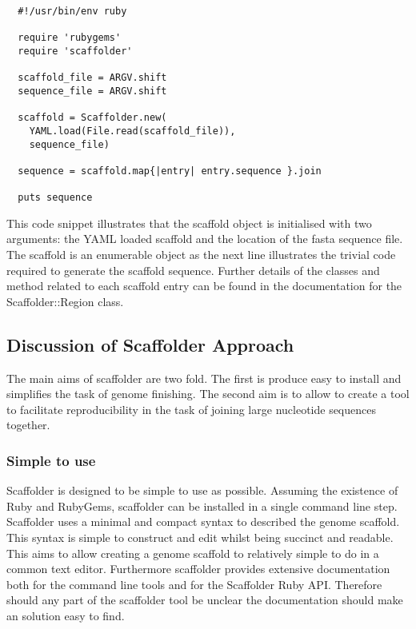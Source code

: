 \documentclass[10pt]{bmc_article}
\newenvironment{bmcformat}{\begin{raggedright}\baselineskip20pt\sloppy\setboolean{publ}{false}}{\end{raggedright}\baselineskip20pt\sloppy}
\begin{document}
\begin{bmcformat}
\begin{verbatim}
  #!/usr/bin/env ruby

  require 'rubygems'
  require 'scaffolder'

  scaffold_file = ARGV.shift
  sequence_file = ARGV.shift

  scaffold = Scaffolder.new(
    YAML.load(File.read(scaffold_file)),
    sequence_file)

  sequence = scaffold.map{|entry| entry.sequence }.join

  puts sequence
\end{verbatim}

This code snippet illustrates that the scaffold object is initialised with two
arguments: the YAML loaded scaffold and the location of the fasta sequence
file. The scaffold is an enumerable object as the next line illustrates the
trivial code required to generate the scaffold sequence. Further details of
the classes and method related to each scaffold entry can be found in the
documentation for the Scaffolder::Region class. \pb

\subsection*{Discussion of Scaffolder Approach} %

The main aims of scaffolder are two fold. The first is produce easy to
install and simplifies the task of genome finishing. The second aim is to
allow to create a tool to facilitate reproducibility in the task of joining
large nucleotide sequences together. \pb

\subsubsection*{Simple to use}

Scaffolder is designed to be simple to use as possible. Assuming the existence
of Ruby and RubyGems, scaffolder can be installed in a single command line
step. Scaffolder uses a minimal and compact syntax to described the genome
scaffold. This syntax is simple to construct and edit whilst being succinct
and readable. This aims to allow creating a genome scaffold to relatively
simple to do in a common text editor. Furthermore scaffolder provides
extensive documentation both for the command line tools and for the Scaffolder
Ruby API. Therefore should any part of the scaffolder tool be unclear the
documentation should make an solution easy to find. \pb


\end{bmcformat}
\end{document}

